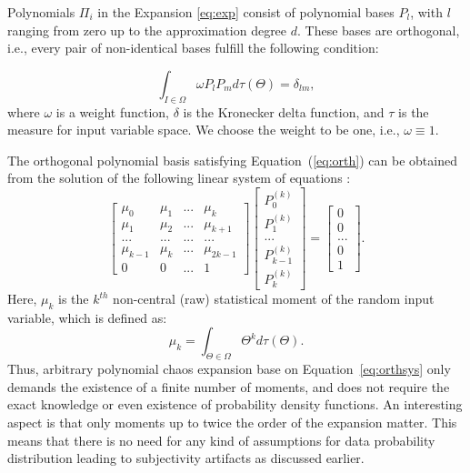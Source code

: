 
Polynomials $\Pi_i$ in the Expansion \ref{eq:exp} consist of polynomial bases
$P_l$, with $l$ ranging from zero up to the approximation degree $d$. These
bases are orthogonal, i.e., every pair of non-identical bases fulfill the
following condition:

\begin{equation}
\int_{I\in\Omega}\omega
P_{l}P_{m}d\tau(\Theta)=\delta_{lm},\label{eq:orth}\end{equation} where $\omega$
is a weight function, $\delta$ is the Kronecker delta function, and $\tau$ is
the measure for input variable space. We choose the weight to be one, i.e.,
$\omega\equiv1$. 

The orthogonal polynomial basis satisfying Equation~(\ref{eq:orth}) can be obtained from the solution of the following linear system of equations \cite{oladyshkin2011concept}: 
%
\begin{equation}
\left[\begin{array}{cccc}
\mu_{0} & \mu_{1} & ... & \mu_{k}\\
\mu_{1} & \mu_{2} & ... & \mu_{k+1}\\
... & ... & ... & ...\\
\mu_{k-1} & \mu_{k} & ... & \mu_{2k-1}\\
0 & 0 & ... & 1\end{array}\right]\left[\begin{array}{c}
P_{0}^{(k)}\\
P_{1}^{(k)}\\
...\\
P_{k-1}^{(k)}\\
P_{k}^{(k)}\end{array}\right]=\left[\begin{array}{c}
0\\
0\\
...\\
0\\
1\end{array}\right].\label{eq:orthsys}\end{equation}
Here, $\mu_{k}$ is the $k^{th}$ non-central (raw) statistical moment of the random input variable, which is defined as:
%
\begin{equation}
\mu_{k}=\int_{\Theta\in\Omega}\Theta^{k}d\tau(\Theta).\label{eq:mnt}
\end{equation}
%
Thus, arbitrary polynomial chaos expansion base on Equation~\ref{eq:orthsys}
only
demands the existence of a finite number of moments, and does not require the
exact knowledge or even existence of probability density functions. An
interesting aspect is that only moments up to twice the order of the expansion
matter. This means that there is no need for any kind of assumptions for data
probability distribution leading to subjectivity artifacts as discussed earlier.

